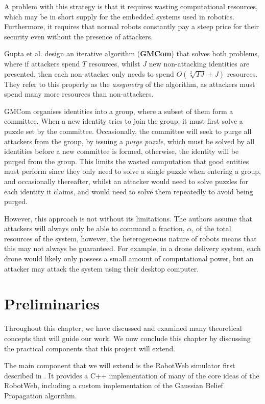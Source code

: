 A problem with this strategy is that it requires wasting computational resources, which may be in short supply for the embedded systems used in robotics. Furthermore, it requires that normal robots constantly pay a steep price for their security even without the presence of attackers.

Gupta et al. \cite{PoW} design an iterative algorithm (\textbf{GMCom}) that solves both problems, where if attackers spend $T$ resources, whilst $J$ new non-attacking identities are presented, then each non-attacker only needs to spend $O(\sqrt[2]{TJ} + J)$ resources. They refer to this property as the \textit{assymetry} of the algorithm, as attackers must spend many more resources than non-attackers.

GMCom organises identities into a group, where a subset of them form a committee. When a new identity tries to join the group, it must first solve a puzzle set by the committee. Occasionally, the committee will seek to purge all attackers from the group, by issuing a \textit{purge puzzle}, which must be solved by all identities before a new committee is formed, otherwise, the identity will be purged from the group. This limits the wasted computation that good entities must perform since they only need to solve a single puzzle when entering a group, and occasionally thereafter, whilst an attacker would need to solve puzzles for each identity it claims, and would need to solve them repeatedly to avoid being purged.

However, this approach is not without its limitations. The authors assume that attackers will always only be able to command a fraction, $\alpha$, of the total resources of the system, however, the heterogeneous nature of robots means that this may not always be guaranteed. For example, in a drone delivery system, each drone would likely only possess a small amount of computational power, but an attacker may attack the system using their desktop computer.

\section{Preliminaries} \label{section:prelim}

Throughout this chapter, we have discussed and examined many theoretical concepts that will guide our work. We now conclude this chapter by discussing the practical components that this project will extend. 

The main component that we will extend is the RobotWeb simulator first described in \cite{Robotweb}. It provides a C++ implementation of many of the core ideas of the RobotWeb, including a custom implementation of the Gaussian Belief Propagation algorithm.

